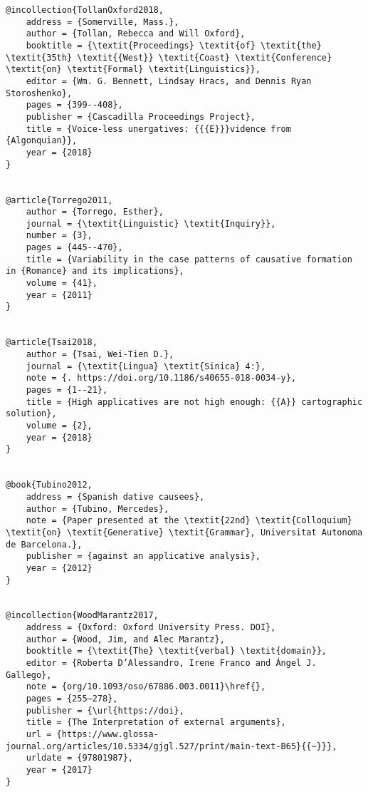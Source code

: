 \documentclass[output=paper,modfonts,nonflat]{langsci/langscibook}
\begin{document}
\begin{verbatim}
@incollection{TollanOxford2018,
	address = {Somerville, Mass.},
	author = {Tollan, Rebecca and Will Oxford},
	booktitle = {\textit{Proceedings} \textit{of} \textit{the} \textit{35th} \textit{{West}} \textit{Coast} \textit{Conference} \textit{on} \textit{Formal} \textit{Linguistics}},
	editor = {Wm. G. Bennett, Lindsay Hracs, and Dennis Ryan Storoshenko},
	pages = {399--408},
	publisher = {Cascadilla Proceedings Project},
	title = {Voice-less unergatives: {{{E}}}vidence from {Algonquian}},
	year = {2018}
}


@article{Torrego2011,
	author = {Torrego, Esther},
	journal = {\textit{Linguistic} \textit{Inquiry}},
	number = {3},
	pages = {445--470},
	title = {Variability in the case patterns of causative formation in {Romance} and its implications},
	volume = {41},
	year = {2011}
}


@article{Tsai2018,
	author = {Tsai, Wei-Tien D.},
	journal = {\textit{Lingua} \textit{Sinica} 4:},
	note = {. https://doi.org/10.1186/s40655-018-0034-y},
	pages = {1--21},
	title = {High applicatives are not high enough: {{A}} cartographic solution},
	volume = {2},
	year = {2018}
}


@book{Tubino2012,
	address = {Spanish dative causees},
	author = {Tubino, Mercedes},
	note = {Paper presented at the \textit{22nd} \textit{Colloquium} \textit{on} \textit{Generative} \textit{Grammar}, Universitat Autonoma de Barcelona.},
	publisher = {against an applicative analysis},
	year = {2012}
}


@incollection{WoodMarantz2017,
	address = {Oxford: Oxford University Press. DOI},
	author = {Wood, Jim, and Alec Marantz},
	booktitle = {\textit{The} \textit{verbal} \textit{domain}},
	editor = {Roberta D’Alessandro, Irene Franco and Ángel J. Gallego},
	note = {org/10.1093/oso/67886.003.0011}\href{},
	pages = {255–278},
	publisher = {\url{https://doi},
	title = {The Interpretation of external arguments},
	url = {https://www.glossa-journal.org/articles/10.5334/gjgl.527/print/main-text-B65}{{~}}},
	urldate = {97801987},
	year = {2017}
}


\end{verbatim}
\sloppy\printbibliography[heading=subbibliography,notkeyword=this]
\end{document}
